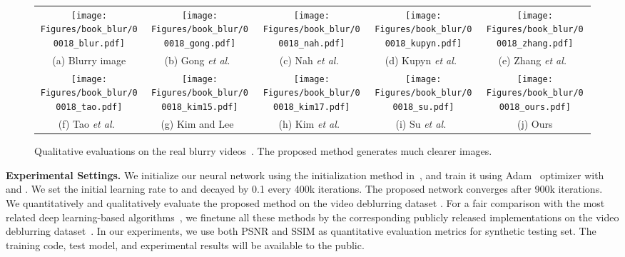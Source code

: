 \documentclass[10pt,twocolumn,letterpaper]{article}
\begin{document}
\begin{figure*}[t]\footnotesize
	\centering
	\renewcommand{\tabcolsep}{1pt}
	\renewcommand{\arraystretch}{1}
	\begin{center}
		\begin{tabular}{ccccc}
			\texttt{[image: Figures/book\_blur/00018\_blur.pdf]} &
			\texttt{[image: Figures/book\_blur/00018\_gong.pdf]} &
			\texttt{[image: Figures/book\_blur/00018\_nah.pdf]} &
			\texttt{[image: Figures/book\_blur/00018\_kupyn.pdf]} &
			\texttt{[image: Figures/book\_blur/00018\_zhang.pdf]} \\
			(a) Blurry image & (b) Gong \textit{et al.}~\cite{gong2017motion} & (c) Nah \textit{et al.}~\cite{nah2017deep}  & (d) Kupyn \textit{et al.}~\cite{kupyn2018deblurgan}& (e) Zhang \textit{et al.}~\cite{zhang2018dynamic}
\vspace{1.5pt}\\
\texttt{[image: Figures/book\_blur/00018\_tao.pdf]}&
			\texttt{[image: Figures/book\_blur/00018\_kim15.pdf]} &
			\texttt{[image: Figures/book\_blur/00018\_kim17.pdf]} &
			\texttt{[image: Figures/book\_blur/00018\_su.pdf]} &
			\texttt{[image: Figures/book\_blur/00018\_ours.pdf]} \\
			(f) Tao \textit{et al.}~\cite{tao2018scale} & (g) Kim and Lee~\cite{hyun2015generalized} & (h) Kim \textit{et al.}~\cite{hyun2017online}  & (i) Su \textit{et al.}~\cite{su2017deep} & (j) Ours \\
		\end{tabular}
	\end{center}
	\vspace{-3mm}
	\caption{Qualitative evaluations on the real blurry videos~\cite{su2017deep}. The proposed method generates much clearer images.}
	\label{fig:show_real}
	\vspace{-3mm}
\end{figure*}


\vspace{-4mm}
\noindent\textbf{Experimental Settings.}
\label{sec:training}
We initialize our neural network using the initialization method in~\cite{he2015delving},
and train it using Adam~\cite{kingma2015adam} optimizer with  and .
We set the initial learning rate to  and decayed by 0.1 every 400k iterations.
The proposed network converges after 900k iterations. 
We quantitatively and qualitatively evaluate the proposed method on the video deblurring dataset \cite{su2017deep}.
For a fair comparison with the most related deep learning-based algorithms~\cite{nah2017deep, kupyn2018deblurgan, zhang2018dynamic, tao2018scale},
we finetune all these methods by the corresponding publicly released implementations on the video deblurring dataset~\cite{su2017deep}.
In our experiments, we use both PSNR and SSIM as quantitative evaluation metrics for synthetic testing set.
The training code, test model, and experimental results will be available to the public.
\end{document}
